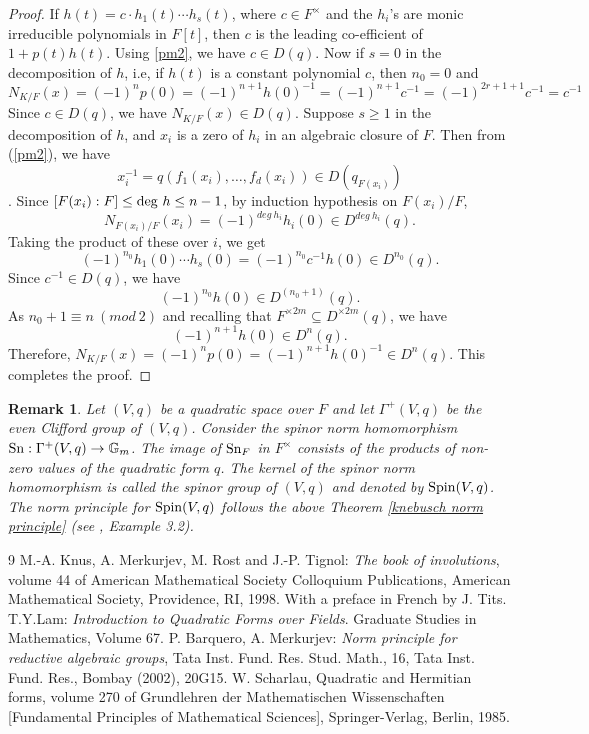 \documentclass[sn-mathphys-num]{sn-jnl}%
\newtheorem{remark}[theorem]{Remark}
\begin{document}
\begin{proof}
If $h(t)=c \cdot h_1(t) \cdots h_s(t)$, where $c \in F^\times$ and the $h_i$'s are monic irreducible polynomials in $F[t]$, then $c$ is the leading co-efficient of $ 1+p(t)h(t)$. Using \ref{pm2}, we have $c \in D(q)$.
Now if $s=0$ in the decomposition of $h$, i.e, if $h(t)$ is a  constant polynomial $c$, then $n_0=0$ and \[
N_{K/F}(x)= (-1)^n p(0)= (-1)^{n+1}h(0)^{-1} = (-1)^{n+1}c^{-1} = (-1)^{2r+1+1}c^{-1}= c^{-1} \]
Since $c \in D(q)$, we have $N_{K/F}(x) \in D(q)$.
Suppose $s \geq 1$ in the decomposition of $h$, and  $x_i$ is a zero of $h_i$ in an algebraic closure of $F$. Then from (\ref{pm2}), we have \[
x_i^{-1}= q(f_1(x_i),\dots,f_d(x_i)) \in D(q_{F(x_i)})\].
Since $[F(x_i):F] \leq {\rm deg}\ h \leq n-1$, by induction hypothesis on $F(x_i)/F$,\[
N_{F(x_i)/F}(x_i)= (-1)^{deg\ h_i}h_i(0) \in D^{deg\ h_i}(q).\]
Taking the product of these over $i$, we get\[
 (-1)^{n_0}h_1(0) \dotsi h_s(0)= (-1)^{n_0} c^{-1} h(0) \in D^{n_0}(q).\]
Since $c^{-1} \in D(q)$, we have\[
(-1)^{n_0} h(0) \in D^ {(n_0+1)} (q).\]
As $n_0+1 \equiv n\ (mod\ 2)$ and recalling that $ F^{\times 2m} \subseteq D^{\times 2m}(q)$, we have\[
(-1)^{n+1} h(0) \in D^ {n} (q).\] Therefore, $N_{K/F}(x)= (-1)^n p(0)= (-1)^{n+1}h(0)^{-1} \in D^n(q)$. This completes the proof.
\end{proof}
\begin{remark}
    Let $(V,q)$ be a quadratic space over $F$ and let $\Gamma^+ (V,q)$ be the even Clifford group of $(V,q)$. Consider the spinor norm homomorphism ${\rm Sn}: \Gamma^+(V,q) \to \mathbb G_m$. The image of ${\rm Sn}_F$ in $F^\times$ consists of the products of non-zero values of the quadratic form $q$. The kernel of the spinor norm homomorphism is called the spinor group of $(V,q)$ and denoted by ${\rm Spin}(V,q)$. The norm principle for ${\rm Spin}(V,q)$ follows the above Theorem \ref{knebusch norm principle} (see \cite{bm}, Example 3.2).
\end{remark}

\begin{thebibliography}{9}
 M.-A. Knus, A. Merkurjev, M. Rost and J.-P. Tignol: {\it The book of involutions},
volume 44 of American Mathematical Society Colloquium Publications,
American Mathematical Society, Providence, RI, 1998. With a preface
in French by J. Tits.
T.Y.Lam:
\textit{Introduction to Quadratic Forms over Fields}.
Graduate Studies in Mathematics, Volume 67.
P. Barquero, A. Merkurjev: {\em Norm principle for reductive algebraic groups}, Tata Inst. Fund. Res. Stud. Math., 16, Tata Inst. Fund. Res., Bombay (2002), 
20G15.
W. Scharlau, Quadratic and Hermitian forms, volume 270 of Grundlehren
der Mathematischen Wissenschaften [Fundamental Principles of Mathematical
Sciences], Springer-Verlag, Berlin, 1985.

\end{thebibliography}
\end{document}
